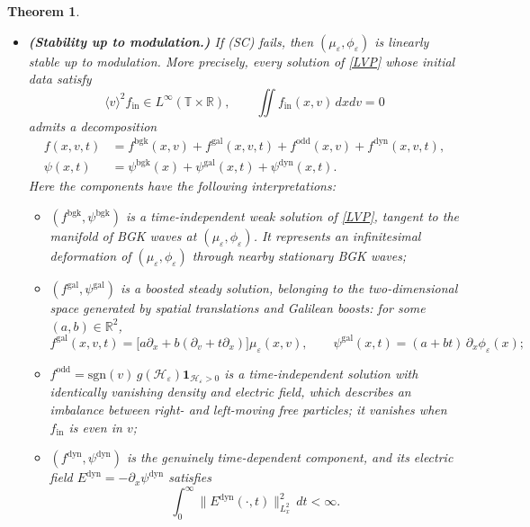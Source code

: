 \documentclass[10pt,reqno]{amsart}
\newtheorem{theorem}{Theorem}
\theoremstyle{definition}
\begin{document}
\begin{theorem}
\begin{itemize}
\item \emph{\bf{(Stability up to modulation.})} If \textup{(SC)} fails, then $(\mu_\varepsilon,\phi_\varepsilon)$ is linearly stable up to modulation. More precisely, every solution of \eqref{LVP} whose initial data satisfy
\[
\langle v\rangle^2f_{\mathrm{in}}\in L^\infty(\mathbb T\times\mathbb R),\qquad \iint f_{\mathrm{in}}(x,v)\,dxdv=0
\]
admits a decomposition
\[
\begin{aligned}
f(x,v,t)&=f^{\mathrm{bgk}}(x,v)+f^{\mathrm{gal}}(x,v,t)+f^{\mathrm{odd}}(x,v)+f^{\mathrm{dyn}}(x,v,t),\\
\psi(x,t)&=\psi^{\mathrm{bgk}}(x)+\psi^{\mathrm{gal}}(x,t)+\psi^{\mathrm{dyn}}(x,t).
\end{aligned}
\]
Here the components have the following interpretations:
\begin{itemize}
\item $(f^{\mathrm{bgk}},\psi^{\mathrm{bgk}})$ is a time-independent weak solution of \eqref{LVP}, tangent to the manifold of BGK waves at $(\mu_\varepsilon,\phi_\varepsilon)$. It represents an infinitesimal deformation of $(\mu_\varepsilon,\phi_\varepsilon)$ through nearby stationary BGK waves;
\item $(f^{\mathrm{gal}},\psi^{\mathrm{gal}})$ is a boosted steady solution, belonging to the two-dimensional space generated by spatial translations and Galilean boosts: for some $(a,b)\in\mathbb R^2$,
\[
f^{\mathrm{gal}}(x,v,t)=\bigl[a\partial_x+b(\partial_v+t\partial_x)\bigr]\mu_\varepsilon(x,v),
\qquad
\psi^{\mathrm{gal}}(x,t)=(a+bt)\,\partial_x\phi_\varepsilon(x);
\]
\item $f^{\mathrm{odd}}=\mathrm{sgn}(v)\,g(\mathcal H_\varepsilon)\mathbf 1_{\mathcal H_\varepsilon>0}$ is a time-independent solution with identically vanishing density and electric field, which describes an imbalance between right- and left-moving free particles; it vanishes when $f_{\mathrm{in}}$ is even in $v$;
\item $(f^{\mathrm{dyn}},\psi^{\mathrm{dyn}})$ is the genuinely time-dependent component, and its electric field $E^{\mathrm{dyn}}=-\partial_x\psi^{\mathrm{dyn}}$ satisfies
\[
\int_0^\infty\bigl\|E^{\mathrm{dyn}}(\cdot,t)\bigr\|_{L^2_x}^2\,dt<\infty.
\]
\end{itemize}
\end{itemize}
\end{theorem}
\end{document}
